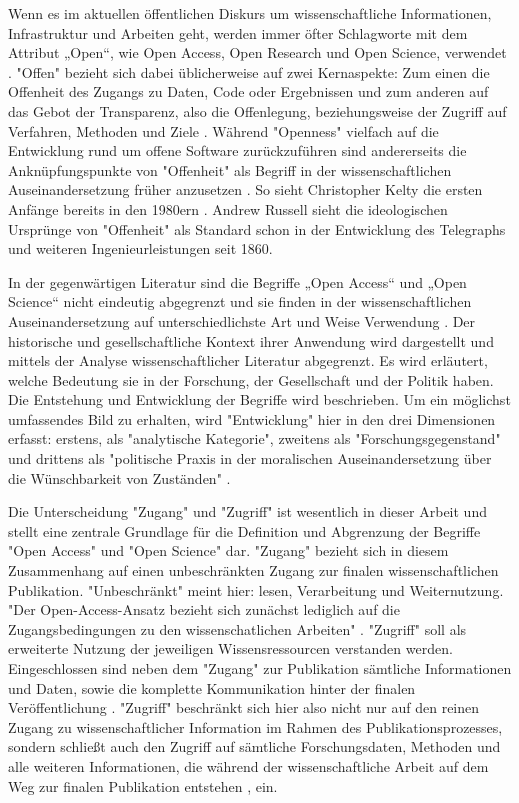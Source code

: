 Wenn es im aktuellen öffentlichen Diskurs um wissenschaftliche Informationen, Infrastruktur und Arbeiten geht, werden immer öfter Schlagworte mit dem Attribut „Open“, wie Open Access, Open Research und Open Science, verwendet \cite{bunz_2014} \cite{schulze_2013_open}. "Offen" bezieht sich dabei üblicherweise auf zwei Kernaspekte: Zum einen die Offenheit des Zugangs zu Daten, Code oder Ergebnissen und zum anderen auf das Gebot der Transparenz, also die Offenlegung, beziehungsweise der Zugriff auf Verfahren, Methoden und Ziele \cite{schulze_2013_open}. Während "Openness" vielfach auf die Entwicklung rund um offene Software zurückzuführen sind andererseits die Anknüpfungspunkte von "Offenheit" als Begriff in der wissenschaftlichen Auseinandersetzung früher anzusetzen \cite{Tkacz_2014}. So sieht Christopher Kel­ty die ersten Anfänge bereits in den 1980ern \cite{kelty_2008_two_bits}. Andrew Russell sieht die ideologischen Ursprünge von "Offenheit" als Standard schon in der Entwicklung des Telegraphs und weiteren Ingenieurleistungen seit 1860\cite{Russell_2014}.

In der gegenwärtigen Literatur sind die Begriffe „Open Access“ und „Open Science“ nicht eindeutig abgegrenzt und sie finden in der wissenschaftlichen Auseinandersetzung auf unterschiedlichste Art und Weise Verwendung \cite{cite:9}. Der historische und gesellschaftliche Kontext ihrer Anwendung wird dargestellt und mittels der Analyse wissenschaftlicher Literatur abgegrenzt. Es wird erläutert, welche Bedeutung sie in der Forschung, der Gesellschaft und der Politik haben. Die Entstehung und Entwicklung der Begriffe wird beschrieben. Um ein möglichst umfassendes Bild zu erhalten, wird "Entwicklung" hier in den drei Dimensionen erfasst: erstens, als "analytische Kategorie", zweitens als "Forschungsgegenstand" und drittens als "politische Praxis in der moralischen Auseinandersetzung über die Wünschbarkeit von Zuständen" \cite{cite:10}.

Die Unterscheidung "Zugang" und "Zugriff" ist wesentlich in dieser Arbeit und stellt eine zentrale Grundlage für die Definition und Abgrenzung der Begriffe "Open Access" und "Open Science" dar. "Zugang" bezieht sich in diesem Zusammenhang auf einen unbeschränkten Zugang zur finalen wissenschaftlichen Publikation. "Unbeschränkt" meint hier: lesen\cite{cite:9a}, Verarbeitung und Weiternutzung. "Der Open-Access-Ansatz bezieht sich zunächst lediglich auf die Zugangsbedingungen zu den wissenschatlichen Arbeiten" \cite{muller_2010_open}. "Zugriff" soll als erweiterte Nutzung der jeweiligen Wissensressourcen verstanden werden. Eingeschlossen sind neben dem "Zugang" zur Publikation sämtliche Informationen und Daten, sowie die komplette Kommunikation hinter der finalen Veröffentlichung \cite{cite:9b}. "Zugriff" beschränkt sich hier also nicht nur auf den reinen Zugang zu wissenschaftlicher Information im Rahmen des Publikationsprozesses, sondern schließt auch den Zugriff auf sämtliche Forschungsdaten, Methoden und alle weiteren Informationen, die während der wissenschaftliche Arbeit auf dem Weg zur finalen Publikation entstehen \cite{cite:9c}, ein. 

